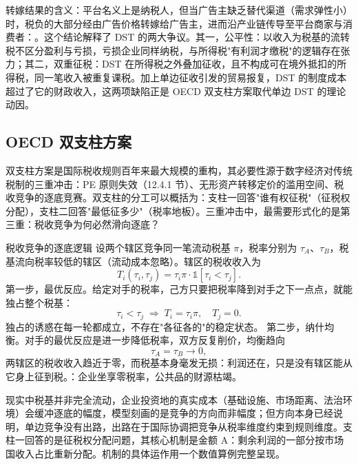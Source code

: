 转嫁结果的含义：平台名义上是纳税人，但当广告主缺乏替代渠道（需求弹性小）时，税负的大部分经由广告价格转嫁给广告主，进而沿产业链传导至平台商家与消费者：。这个结论解释了 DST 的两大争议。其一，公平性：以收入为税基的流转税不区分盈利与亏损，亏损企业同样纳税，与所得税"有利润才缴税"的逻辑存在张力；其二，双重征税：DST 在所得税之外叠加征收，且不构成可在境外抵扣的所得税，同一笔收入被重复课税。加上单边征收引发的贸易报复，DST 的制度成本超过了它的财政收入，这两项缺陷正是 OECD 双支柱方案取代单边 DST 的理论动因。

\subsection{OECD 双支柱方案}

双支柱方案是国际税收规则百年来最大规模的重构，其必要性源于数字经济对传统税制的三重冲击：PE 原则失效（12.4.1 节）、无形资产转移定价的滥用空间、税收竞争的逐底竞赛。双支柱的分工可以概括为：支柱一回答"谁有权征税"（征税权分配），支柱二回答"最低征多少"（税率地板）。三重冲击中，最需要形式化的是第三重：税收竞争为何必然滑向逐底？

\begin{derivation}{税收竞争的逐底逻辑}{}
设两个辖区竞争同一笔流动税基 $\pi$，税率分别为 $\tau_A$、$\tau_B$，税基流向税率较低的辖区（流动成本忽略）。辖区的税收收入为
\[
T_i(\tau_i, \tau_j) = \tau_i \pi \cdot \mathbb{1}[\tau_i < \tau_j].
\]
第一步，最优反应。给定对手的税率，己方只要把税率降到对手之下一点点，就能独占整个税基：
\[
\tau_i < \tau_j \;\Rightarrow\; T_i = \tau_i \pi,\quad T_j = 0.
\]
独占的诱惑在每一轮都成立，不存在"各征各的"的稳定状态。
第二步，纳什均衡。对手的最优反应是进一步降低税率，双方反复削价，均衡趋向
\[
\tau_A = \tau_B \to 0,
\]
两辖区的税收收入趋近于零，而税基本身毫发无损：利润还在，只是没有辖区能从它身上征到税。：企业坐享零税率，公共品的财源枯竭。
\end{derivation}

现实中税基并非完全流动，企业投资地的真实成本（基础设施、市场距离、法治环境）会缓冲逐底的幅度，模型刻画的是竞争的方向而非幅度；但方向本身已经说明，单边竞争没有出路，出路在于国际协调把竞争从税率维度约束到规则维度。支柱一回答的是征税权分配问题，其核心机制是金额 A：剩余利润的一部分按市场国收入占比重新分配。机制的具体运作用一个数值算例完整呈现。

